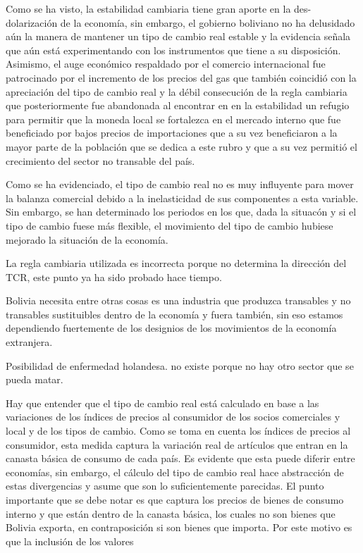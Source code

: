 \documentclass[12pt,letterpaper]{article}
\begin{document}
Como se ha visto, la estabilidad cambiaria tiene gran aporte en la des-dolarización de la economía, sin embargo, el gobierno boliviano no ha delusidado aún la manera de mantener un tipo de cambio real estable y la evidencia señala que aún está experimentando con los instrumentos que tiene a su disposición. Asimismo, el auge económico respaldado por el comercio internacional fue patrocinado por el incremento de los precios del gas que también coincidió con la apreciación del tipo de cambio real y la débil consecución de la regla cambiaria que posteriormente fue abandonada al encontrar en en la estabilidad un refugio para permitir que la moneda local se fortalezca en el mercado interno que fue beneficiado por bajos precios de importaciones que a su vez beneficiaron a la mayor parte de la población que se dedica a este rubro y que a su vez permitió el crecimiento del sector no transable del país.


Como se ha evidenciado, el tipo de cambio real no es muy influyente para mover la balanza comercial debido a la inelasticidad de sus componentes a esta variable. Sin embargo, se han determinado los periodos en los que, dada la situacón y si el tipo de cambio fuese más flexible, el movimiento del tipo de cambio hubiese mejorado la situación de la economía.


La regla cambiaria utilizada es incorrecta porque no determina la dirección del TCR, este punto ya ha sido probado hace tiempo.


Bolivia necesita entre otras cosas es una industria que produzca transables y no transables sustituibles dentro de la economía y fuera también, sin eso estamos dependiendo fuertemente de los designios de los movimientos de la economía extranjera.

Posibilidad de enfermedad holandesa. no existe porque no hay otro sector que se pueda matar.


Hay que entender que el tipo de cambio real está calculado en base a las variaciones de los índices de precios al consumidor de los socios comerciales y local y de los tipos de cambio. Como se toma en cuenta los índices de precios al consumidor, esta medida captura la variación real de artículos que entran en la canasta básica de consumo de cada país. Es evidente que esta puede diferir entre economías, sin embargo, el cálculo del tipo de cambio real hace abstracción de estas divergencias y asume que son lo suficientemente parecidas. El punto importante que se debe notar es que captura los precios de bienes de consumo interno y que están dentro de la canasta básica, los cuales no son bienes que Bolivia exporta, en contraposición si son bienes que importa. Por este motivo es que la inclusión de los valores 




\end{document}
